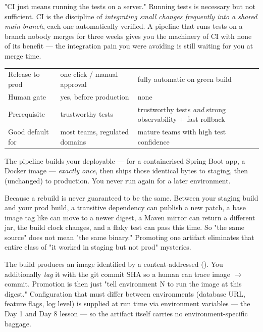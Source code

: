 \begin{misconception}
"CI just means running the tests on a server." Running tests is necessary but not sufficient. CI is the discipline of \emph{integrating small changes frequently into a shared main branch}, each one automatically verified. A pipeline that runs tests on a branch nobody merges for three weeks gives you the machinery of CI with none of its benefit --- the integration pain you were avoiding is still waiting for you at merge time.
\end{misconception}

\begin{center}\small
\begin{tabularx}{\linewidth}{@{}L{30mm} X X@{}}
 &  & \\\midrule
Release to prod & one click / manual approval & fully automatic on green build\\
Human gate & yes, before production & none\\
Prerequisite & trustworthy tests & trustworthy tests \emph{and} strong observability + fast rollback\\
Good default for & most teams, regulated domains & mature teams with high test confidence\\
\end{tabularx}\end{center}


 The pipeline builds your deployable  --- for a containerised Spring Boot app, a Docker image --- \emph{exactly once}, then ships those identical bytes to staging, then (unchanged) to production. You never run  again for a later environment.

 Because a rebuild is never guaranteed to be the same. Between your staging build and your prod build, a transitive dependency can publish a new patch, a base image tag like  can move to a newer digest, a Maven mirror can return a different jar, the build clock changes, and a flaky test can pass this time. So "the same source" does not mean "the same binary." Promoting one artifact eliminates that entire class of "it worked in staging but not prod" mysteries.

 The build produces an image identified by a content-addressed  (). You additionally \emph{tag} it with the git commit SHA so a human can trace image $\rightarrow$ commit. Promotion is then just "tell environment N to run the image at this digest." Configuration that must differ between environments (database URL, feature flags, log level) is supplied at run time via environment variables --- the Day 1 and Day 8 lesson --- so the artifact itself carries no environment-specific baggage.

